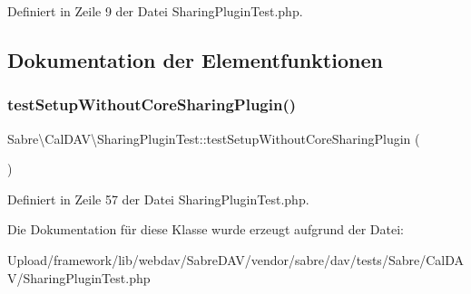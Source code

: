 Definiert in Zeile 9 der Datei Sharing\+Plugin\+Test.\+php.



\subsection{Dokumentation der Elementfunktionen}
\mbox{\label{class_sabre_1_1_cal_d_a_v_1_1_sharing_plugin_test_aa373f581ba78885316336a85826b266a}} 
\subsubsection{\texorpdfstring{test\+Setup\+Without\+Core\+Sharing\+Plugin()}{testSetupWithoutCoreSharingPlugin()}}
{\footnotesize\ttfamily Sabre\textbackslash{}\+Cal\+D\+A\+V\textbackslash{}\+Sharing\+Plugin\+Test\+::test\+Setup\+Without\+Core\+Sharing\+Plugin (\begin{DoxyParamCaption}{ }\end{DoxyParamCaption})}



Definiert in Zeile 57 der Datei Sharing\+Plugin\+Test.\+php.



Die Dokumentation für diese Klasse wurde erzeugt aufgrund der Datei\+:\begin{DoxyCompactItemize}
\item 
Upload/framework/lib/webdav/\+Sabre\+D\+A\+V/vendor/sabre/dav/tests/\+Sabre/\+Cal\+D\+A\+V/Sharing\+Plugin\+Test.\+php\end{DoxyCompactItemize}
